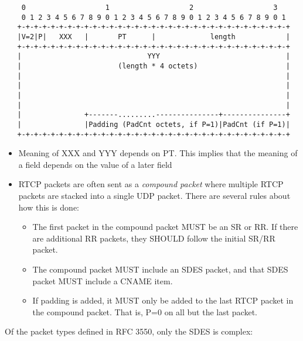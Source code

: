 \documentclass[10pt]{article}
\begin{document}
\footnotesize
\begin{verbatim}
    0                   1                   2                   3
    0 1 2 3 4 5 6 7 8 9 0 1 2 3 4 5 6 7 8 9 0 1 2 3 4 5 6 7 8 9 0 1
   +-+-+-+-+-+-+-+-+-+-+-+-+-+-+-+-+-+-+-+-+-+-+-+-+-+-+-+-+-+-+-+-+
   |V=2|P|   XXX   |       PT      |             length            |
   +-+-+-+-+-+-+-+-+-+-+-+-+-+-+-+-+-+-+-+-+-+-+-+-+-+-+-+-+-+-+-+-+
   |                              YYY                              |
   |                       (length * 4 octets)                     |
   |                                                               |
   |                                                               |
   |                                                               |
   |                                                               |
   |               +-------.........---------------+---------------+
   |               |Padding (PadCnt octets, if P=1)|PadCnt (if P=1)|
   +-+-+-+-+-+-+-+-+-+-+-+-+-+-+-+-+-+-+-+-+-+-+-+-+-+-+-+-+-+-+-+-+
\end{verbatim}
\normalsize

\begin{itemize}
  \item  Meaning of XXX and YYY depends on PT. This implies that the
    meaning of a field depends on the value of a later field
  \item RTCP packets are often sent as a \emph{compound packet} where
    multiple RTCP packets are stacked into a single UDP packet. There
    are several rules about how this is done:
    \begin{itemize}
      \item The first packet in the compound packet MUST be an SR or RR.
        If there are additional RR packets, they SHOULD follow the initial
        SR/RR packet.
      \item The compound packet MUST include an SDES packet, and that SDES 
        packet MUST include a CNAME item.
      \item If padding is added, it MUST only be added to the last RTCP
        packet in the compound packet. That is, P=0 on all but the last
        packet. 
    \end{itemize}
\end{itemize}

Of the packet types defined in RFC 3550, only the SDES is complex:
\end{document}
